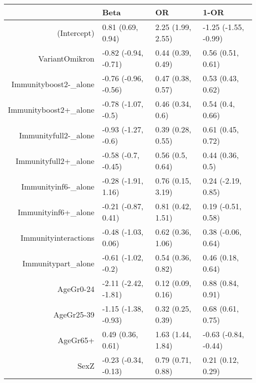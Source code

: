 \begin{table}[ht]
\centering
\begin{tabular}{rlll}
  \hline
 & Beta & OR & 1-OR \\ 
  \hline
(Intercept) & 0.81 (0.69, 0.94) & 2.25 (1.99, 2.55) & -1.25 (-1.55, -0.99) \\ 
  VariantOmikron & -0.82 (-0.94, -0.71) & 0.44 (0.39, 0.49) & 0.56 (0.51, 0.61) \\ 
  Immunityboost2-\_alone & -0.76 (-0.96, -0.56) & 0.47 (0.38, 0.57) & 0.53 (0.43, 0.62) \\ 
  Immunityboost2+\_alone & -0.78 (-1.07, -0.5) & 0.46 (0.34, 0.6) & 0.54 (0.4, 0.66) \\ 
  Immunityfull2-\_alone & -0.93 (-1.27, -0.6) & 0.39 (0.28, 0.55) & 0.61 (0.45, 0.72) \\ 
  Immunityfull2+\_alone & -0.58 (-0.7, -0.45) & 0.56 (0.5, 0.64) & 0.44 (0.36, 0.5) \\ 
  Immunityinf6-\_alone & -0.28 (-1.91, 1.16) & 0.76 (0.15, 3.19) & 0.24 (-2.19, 0.85) \\ 
  Immunityinf6+\_alone & -0.21 (-0.87, 0.41) & 0.81 (0.42, 1.51) & 0.19 (-0.51, 0.58) \\ 
  Immunityinteractions & -0.48 (-1.03, 0.06) & 0.62 (0.36, 1.06) & 0.38 (-0.06, 0.64) \\ 
  Immunitypart\_alone & -0.61 (-1.02, -0.2) & 0.54 (0.36, 0.82) & 0.46 (0.18, 0.64) \\ 
  AgeGr0-24 & -2.11 (-2.42, -1.81) & 0.12 (0.09, 0.16) & 0.88 (0.84, 0.91) \\ 
  AgeGr25-39 & -1.15 (-1.38, -0.93) & 0.32 (0.25, 0.39) & 0.68 (0.61, 0.75) \\ 
  AgeGr65+ & 0.49 (0.36, 0.61) & 1.63 (1.44, 1.84) & -0.63 (-0.84, -0.44) \\ 
  SexZ & -0.23 (-0.34, -0.13) & 0.79 (0.71, 0.88) & 0.21 (0.12, 0.29) \\ 
   \hline
\end{tabular}
\end{table}
